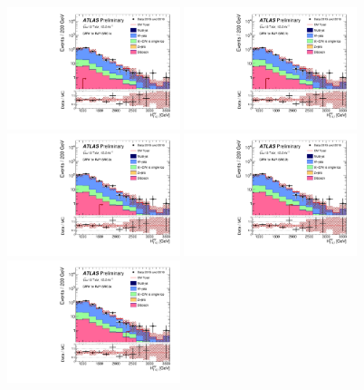\clearpage
\begin{figure}[tbp]
\begin{center}
\includegraphics[width=0.45\textwidth]{figures/ATLAS-CONF-2016-078_INT/N-1Plots/AtlasStyle/Preliminary/CRW_SRJigsawSRG1a_LastCut_CRW_minusone}
\includegraphics[width=0.45\textwidth]{figures/ATLAS-CONF-2016-078_INT/N-1Plots/AtlasStyle/Preliminary/CRW_SRJigsawSRG1b_LastCut_CRW_minusone}
\includegraphics[width=0.45\textwidth]{figures/ATLAS-CONF-2016-078_INT/N-1Plots/AtlasStyle/Preliminary/CRW_SRJigsawSRG2a_LastCut_CRW_minusone}
\includegraphics[width=0.45\textwidth]{figures/ATLAS-CONF-2016-078_INT/N-1Plots/AtlasStyle/Preliminary/CRW_SRJigsawSRG2b_LastCut_CRW_minusone}
\includegraphics[width=0.45\textwidth]{figures/ATLAS-CONF-2016-078_INT/N-1Plots/AtlasStyle/Preliminary/CRW_SRJigsawSRG3a_LastCut_CRW_minusone}

\end{center}
\end{figure}
